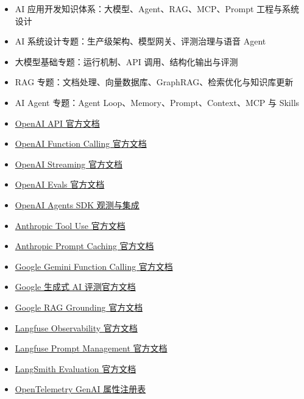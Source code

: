 \documentclass[9pt,a4paper,twocolumn]{ctexart}
\begin{document}
\begin{itemize}[itemsep=1pt, topsep=2pt]
  \item AI 应用开发知识体系：大模型、Agent、RAG、MCP、Prompt 工程与系统设计
  \item AI 系统设计专题：生产级架构、模型网关、评测治理与语音 Agent
  \item 大模型基础专题：运行机制、API 调用、结构化输出与评测
  \item RAG 专题：文档处理、向量数据库、GraphRAG、检索优化与知识库更新
  \item AI Agent 专题：Agent Loop、Memory、Prompt、Context、MCP 与 Skills
  \item \href{https://developers.openai.com/api/docs}{OpenAI API 官方文档}
  \item \href{https://developers.openai.com/api/docs/guides/function-calling}{OpenAI Function Calling 官方文档}
  \item \href{https://developers.openai.com/api/docs/guides/streaming-responses}{OpenAI Streaming 官方文档}
  \item \href{https://developers.openai.com/api/docs/guides/evals}{OpenAI Evals 官方文档}
  \item \href{https://developers.openai.com/api/docs/guides/agents/integrations-observability}{OpenAI Agents SDK 观测与集成}
  \item \href{https://platform.claude.com/docs/en/agents-and-tools/tool-use/overview}{Anthropic Tool Use 官方文档}
  \item \href{https://platform.claude.com/docs/en/build-with-claude/prompt-caching}{Anthropic Prompt Caching 官方文档}
  \item \href{https://docs.cloud.google.com/gemini-enterprise-agent-platform/models/tools/function-calling}{Google Gemini Function Calling 官方文档}
  \item \href{https://docs.cloud.google.com/gemini-enterprise-agent-platform/models/evaluation-overview}{Google 生成式 AI 评测官方文档}
  \item \href{https://docs.cloud.google.com/gemini-enterprise-agent-platform/models/grounding/ground-responses-using-rag}{Google RAG Grounding 官方文档}
  \item \href{https://langfuse.com/docs/observability/overview}{Langfuse Observability 官方文档}
  \item \href{https://langfuse.com/docs/prompt-management/overview}{Langfuse Prompt Management 官方文档}
  \item \href{https://docs.langchain.com/langsmith/evaluation}{LangSmith Evaluation 官方文档}
  \item \href{https://opentelemetry.io/docs/specs/semconv/registry/attributes/gen-ai/}{OpenTelemetry GenAI 属性注册表}
\end{itemize}
\end{document}
